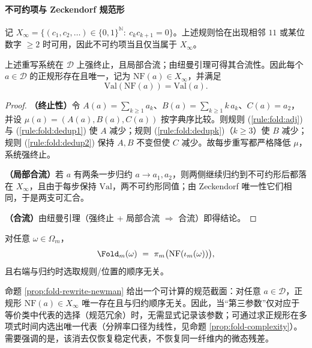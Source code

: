 \paragraph{不可约项与 Zeckendorf 规范形}
记 $X_\infty=\{(c_1,c_2,\dots)\in\{0,1\}^{\mathbb{N}}:\ c_kc_{k+1}=0\}$。上述规则恰在出现相邻 $11$ 或某位数字 $\ge 2$ 时可用，因此不可约项当且仅当属于 $X_\infty$。

\begin{proposition}\label{prop:fold-rewrite-newman}
上述重写系统在 $\mathcal{D}$ 上强终止，且局部合流；由纽曼引理可得其合流性。因此每个 $a\in\mathcal{D}$ 的正规形存在且唯一，记为 $\mathrm{NF}(a)\in X_\infty$，并满足
\[
\mathrm{Val}(\mathrm{NF}(a))=\mathrm{Val}(a).
\]
\end{proposition}

\begin{proof}
\textbf{（终止性）}令 $A(a)=\sum_{k\ge 1} a_k$、$B(a)=\sum_{k\ge 1} k\,a_k$、$C(a)=a_2$，并设 $\mu(a)=(A(a),B(a),C(a))$ 按字典序比较。则规则 (\ref{rule:fold:adj}) 与 (\ref{rule:fold:dedup1}) 使 $A$ 减少；规则 (\ref{rule:fold:dedupk})（$k\ge 3$）使 $B$ 减少；规则 (\ref{rule:fold:dedup2}) 保持 $A,B$ 不变但使 $C$ 减少。故每步重写都严格降低 $\mu$，系统强终止。

\textbf{（局部合流）}若 $a$ 有两条一步归约 $a\to a_1,a_2$，则两侧继续归约到不可约形后都落在 $X_\infty$，且由于每步保持 $\mathrm{Val}$，两不可约形同值；由 Zeckendorf 唯一性它们相同，于是两支可汇合。

\textbf{（合流）}由纽曼引理（强终止 + 局部合流 $\Rightarrow$ 合流）即得结论。
\end{proof}

\begin{corollary}\label{cor:foldm-order-indep}
对任意 $\omega\in\Omega_m$，
\[
\Fold_m(\omega)\ =\ \pi_m\bigl(\mathrm{NF}(\iota_m(\omega))\bigr),
\]
且右端与归约时选取规则/位置的顺序无关。
\end{corollary}

\begin{remark}[规范截面与可计算性]\label{rem:fold-normal-form-computable-section}
命题 \ref{prop:fold-rewrite-newman} 给出一个可计算的规范截面：对任意 $a\in\mathcal{D}$，正规形 $\mathrm{NF}(a)\in X_\infty$ 唯一存在且与归约顺序无关。因此，当“第三参数”仅对应于等价类中代表的选择（规范冗余）时，无需显式记录该参数；可通过求正规形在多项式时间内选出唯一代表（分辨率口径为线性，见命题 \ref{prop:fold-complexity}）。需要强调的是，该消去仅恢复稳定代表，不恢复同一纤维内的微态残差。
\end{remark}

